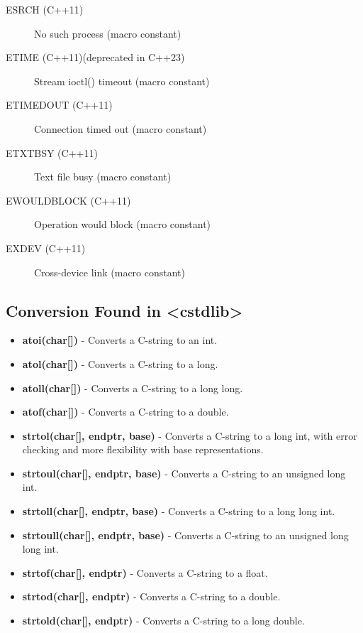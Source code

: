 \documentclass{report}
\begin{document}
\begin{itemize}
\begin{description}
      \item[ESRCH (C++11)] No such process (macro constant)
      \item[ETIME (C++11)(deprecated in C++23)] Stream ioctl() timeout (macro constant)
      \item[ETIMEDOUT (C++11)] Connection timed out (macro constant)
      \item[ETXTBSY (C++11)] Text file busy (macro constant)
      \item[EWOULDBLOCK (C++11)] Operation would block (macro constant)
      \item[EXDEV (C++11)] Cross-device link (macro constant)
    \end{description}
    \end{itemize}

    \bigbreak \noindent 
    \subsection{Conversion Found in <cstdlib>}
    \begin{itemize}
        \item \textbf{atoi(char[])} - Converts a C-string to an int.
        \item \textbf{atol(char[])} - Converts a C-string to a long.
        \item \textbf{atoll(char[])} - Converts a C-string to a long long.
        \item \textbf{atof(char[])} - Converts a C-string to a double.
        \item \textbf{strtol(char[], endptr, base)} - Converts a C-string to a long int, with error checking and more flexibility with base representations.
        \item \textbf{strtoul(char[], endptr, base)} - Converts a C-string to an unsigned long int.
        \item \textbf{strtoll(char[], endptr, base)} - Converts a C-string to a long long int.
        \item \textbf{strtoull(char[], endptr, base)} - Converts a C-string to an unsigned long long int.
        \item \textbf{strtof(char[], endptr)} - Converts a C-string to a float.
        \item \textbf{strtod(char[], endptr)} - Converts a C-string to a double.
        \item \textbf{strtold(char[], endptr)} - Converts a C-string to a long double.
    \end{itemize}
    \bigbreak \noindent 
\end{document}
